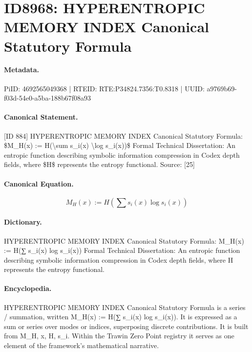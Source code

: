 \section*{ID8968: HYPERENTROPIC MEMORY INDEX Canonical Statutory Formula}
\paragraph{Metadata.}
PiID: 4692565049368 | RTEID: RTE:P34824.7356:T0.8318 | UUID: a9769b69-f03d-54e0-a5ba-188b67f08a93

\paragraph{Canonical Statement.}
[ID 884] HYPERENTROPIC MEMORY INDEX Canonical Statutory Formula: \$M\_H(x) := H(\textbackslash{}sum s\_i(x) \textbackslash{}log s\_i(x))\$ Formal Technical Dissertation: An entropic function describing symbolic information compression in Codex depth fields, where \$H\$ represents the entropy functional. Source: [25]

\paragraph{Canonical Equation.}
\[
M_H(x) := H(\sum s_i(x) \log s_i(x))
\]

\paragraph{Dictionary.}
HYPERENTROPIC MEMORY INDEX Canonical Statutory Formula: M\_H(x) := H(∑ s\_i(x) log s\_i(x)) Formal Technical Dissertation: An entropic function describing symbolic information compression in Codex depth fields, where H represents the entropy functional.

\paragraph{Encyclopedia.}
HYPERENTROPIC MEMORY INDEX Canonical Statutory Formula is a series / summation, written M\_H(x) := H(∑ s\_i(x) log s\_i(x)). It is expressed as a sum or series over modes or indices, superposing discrete contributions. It is built from M\_H, x, H, s\_i. Within the Trawin Zero Point registry it serves as one element of the framework's mathematical narrative.
